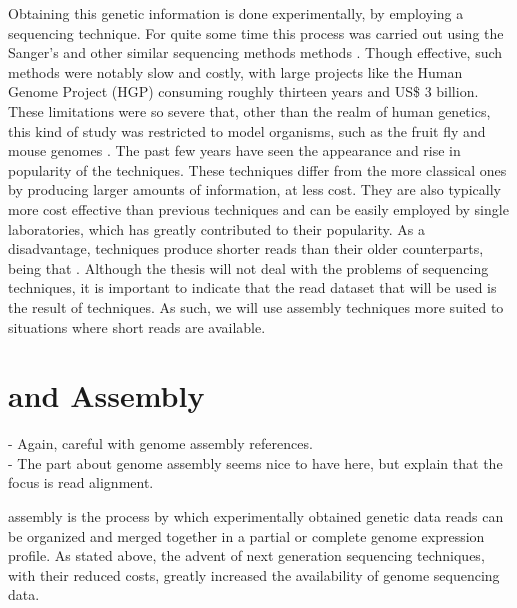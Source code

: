 Obtaining this genetic information is done experimentally, by employing a
sequencing technique. For quite some time this process was carried out using
the Sanger's and other similar sequencing methods methods
\cite{Reis-Filho2009}. Though effective, such methods were notably slow and
costly, with large projects like the Human Genome Project (HGP) consuming
roughly thirteen years and US\$ 3 billion. These limitations were so severe
that, other than the realm of human genetics, this kind of study was restricted
to model organisms, such as the fruit fly and mouse genomes \cite{Wolf2013}.
The past few years have seen the appearance and rise in popularity of the
\ngs{} techniques. These techniques differ from the more classical ones by
producing larger amounts of information, at less cost. They are also typically
more cost effective than previous techniques and can be easily employed by
single laboratories, which has greatly contributed to their popularity. As a
disadvantage, \ngs{} techniques produce shorter reads than their older
counterparts, being that  \cite[p.
671]{Martin2011}. Although the thesis will not deal with the problems of
sequencing techniques, it is important to indicate that the read dataset that
will be used is the result of \ngs{} techniques. As such, we will use assembly
techniques more suited to situations where short reads are available.

\section{\rnaseq{} and \Trans{} Assembly}\label{sec:assembly}

\begin{Notes}
- Again, careful with genome assembly references.\\
- The part about genome assembly seems nice to have here, but explain that the
focus is read alignment.\\
\end{Notes}

\Trans{} assembly is the process by which experimentally obtained genetic data
reads can be organized and merged together in a partial or complete genome
expression profile. As stated above, the advent of next generation sequencing
techniques, with their reduced costs, greatly increased the availability of
genome sequencing data.

